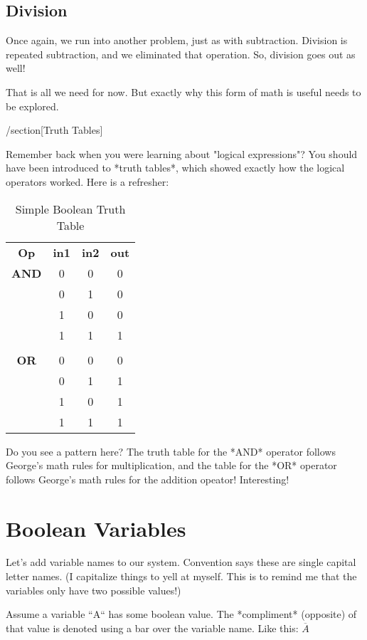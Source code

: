\subsection{Division}

Once again, we run into another problem, just as with subtraction. Division is
repeated subtraction, and we eliminated that operation. So, division goes out
as well!

That is all we need for now. But exactly why this form of math is useful needs
to be explored.

/section[Truth Tables]

Remember back when you were learning about "logical expressions"? You should
have been introduced to *truth tables*, which showed exactly how the logical
operators worked. Here is a refresher:

\begin{table}[tbp]
	\begin{tabular}{ |c|c|c|c| }
	\toprule
        \textbf{Op} & \textbf{in1} & \textbf{in2} & \textbf{out} \\
  	\textbf{AND} & 0 & 0 & 0 \\
		& 0 & 1 & 0 \\
		& 1 & 0 & 0 \\
		& 1 & 1 & 1 \\
	\\
		\textbf{OR} & 0 & 0 & 0 \\
		& 0 & 1 & 1 \\
		& 1 & 0 & 1 \\
		& 1 & 1 & 1
	\end{tabular}
	\caption{Simple Boolean Truth Table}
\end{table}

Do you see a pattern here? The truth table for the *AND* operator follows George's
math rules for multiplication, and the table for the *OR* operator follows George's
math rules for the addition opeator! Interesting!

\section{Boolean Variables}

Let's add variable names to our system. Convention says these are single
capital letter names. (I capitalize things to yell at myself. This is to remind
me that the variables only have two possible values!)

Assume a variable ``A`` has some boolean value. The *compliment* (opposite) of
that value is denoted using a bar over the variable name. Like this: $\overline{A}$ 

